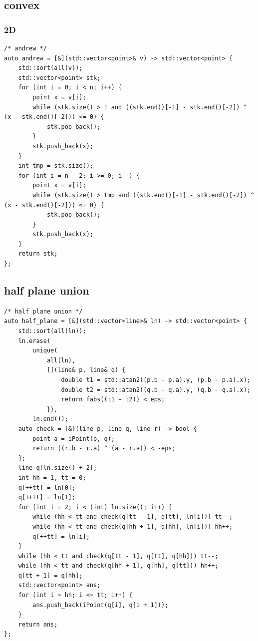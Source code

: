 \documentclass[UTF8, a4paper, titlepage, twoside]{ctexart}
\begin{document}
\subsection{ convex }
\subsubsection*{ 2D }
\begin{lstlisting}[style=cpp]
/* andrew */
auto andrew = [&](std::vector<point>& v) -> std::vector<point> {
    std::sort(all(v));
    std::vector<point> stk;
    for (int i = 0; i < n; i++) {
        point x = v[i];
        while (stk.size() > 1 and ((stk.end()[-1] - stk.end()[-2]) ^ (x - stk.end()[-2])) <= 0) {
            stk.pop_back();
        }
        stk.push_back(x);
    }
    int tmp = stk.size();
    for (int i = n - 2; i >= 0; i--) {
        point x = v[i];
        while (stk.size() > tmp and ((stk.end()[-1] - stk.end()[-2]) ^ (x - stk.end()[-2])) <= 0) {
            stk.pop_back();
        }
        stk.push_back(x);
    }
    return stk;
};
\end{lstlisting}

\subsection{ half plane union }
\begin{lstlisting}[style=cpp]
/* half plane union */
auto half_plane = [&](std::vector<line>& ln) -> std::vector<point> {
    std::sort(all(ln));
    ln.erase(
        unique(
            all(ln),
            [](line& p, line& q) {
                double t1 = std::atan2((p.b - p.a).y, (p.b - p.a).x);
                double t2 = std::atan2((q.b - q.a).y, (q.b - q.a).x);
                return fabs((t1 - t2)) < eps;
            }),
        ln.end());
    auto check = [&](line p, line q, line r) -> bool {
        point a = iPoint(p, q);
        return ((r.b - r.a) ^ (a - r.a)) < -eps;
    };
    line q[ln.size() + 2];
    int hh = 1, tt = 0;
    q[++tt] = ln[0];
    q[++tt] = ln[1];
    for (int i = 2; i < (int) ln.size(); i++) {
        while (hh < tt and check(q[tt - 1], q[tt], ln[i])) tt--;
        while (hh < tt and check(q[hh + 1], q[hh], ln[i])) hh++;
        q[++tt] = ln[i];
    }
    while (hh < tt and check(q[tt - 1], q[tt], q[hh])) tt--;
    while (hh < tt and check(q[hh + 1], q[hh], q[tt])) hh++;
    q[tt + 1] = q[hh];
    std::vector<point> ans;
    for (int i = hh; i <= tt; i++) {
        ans.push_back(iPoint(q[i], q[i + 1]));
    }
    return ans;
};
\end{lstlisting}
\end{document}

